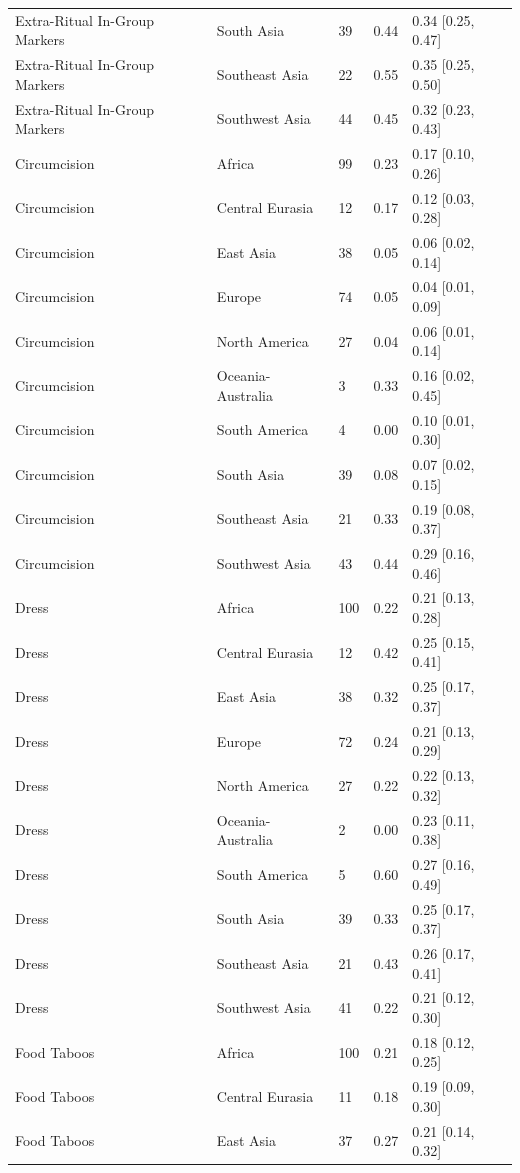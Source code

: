 \begin{longtable}{lllll}
Extra-Ritual In-Group Markers & South Asia & 39 & 0.44 & 0.34 [0.25, 0.47] \\
Extra-Ritual In-Group Markers & Southeast Asia & 22 & 0.55 & 0.35 [0.25, 0.50] \\
Extra-Ritual In-Group Markers & Southwest Asia & 44 & 0.45 & 0.32 [0.23, 0.43] \\
Circumcision & Africa & 99 & 0.23 & 0.17 [0.10, 0.26] \\
Circumcision & Central Eurasia & 12 & 0.17 & 0.12 [0.03, 0.28] \\
Circumcision & East Asia & 38 & 0.05 & 0.06 [0.02, 0.14] \\
Circumcision & Europe & 74 & 0.05 & 0.04 [0.01, 0.09] \\
Circumcision & North America & 27 & 0.04 & 0.06 [0.01, 0.14] \\
Circumcision & Oceania-Australia & 3 & 0.33 & 0.16 [0.02, 0.45] \\
Circumcision & South America & 4 & 0.00 & 0.10 [0.01, 0.30] \\
Circumcision & South Asia & 39 & 0.08 & 0.07 [0.02, 0.15] \\
Circumcision & Southeast Asia & 21 & 0.33 & 0.19 [0.08, 0.37] \\
Circumcision & Southwest Asia & 43 & 0.44 & 0.29 [0.16, 0.46] \\
Dress & Africa & 100 & 0.22 & 0.21 [0.13, 0.28] \\
Dress & Central Eurasia & 12 & 0.42 & 0.25 [0.15, 0.41] \\
Dress & East Asia & 38 & 0.32 & 0.25 [0.17, 0.37] \\
Dress & Europe & 72 & 0.24 & 0.21 [0.13, 0.29] \\
Dress & North America & 27 & 0.22 & 0.22 [0.13, 0.32] \\
Dress & Oceania-Australia & 2 & 0.00 & 0.23 [0.11, 0.38] \\
Dress & South America & 5 & 0.60 & 0.27 [0.16, 0.49] \\
Dress & South Asia & 39 & 0.33 & 0.25 [0.17, 0.37] \\
Dress & Southeast Asia & 21 & 0.43 & 0.26 [0.17, 0.41] \\
Dress & Southwest Asia & 41 & 0.22 & 0.21 [0.12, 0.30] \\
Food Taboos & Africa & 100 & 0.21 & 0.18 [0.12, 0.25] \\
Food Taboos & Central Eurasia & 11 & 0.18 & 0.19 [0.09, 0.30] \\
Food Taboos & East Asia & 37 & 0.27 & 0.21 [0.14, 0.32] \\

\end{longtable}
